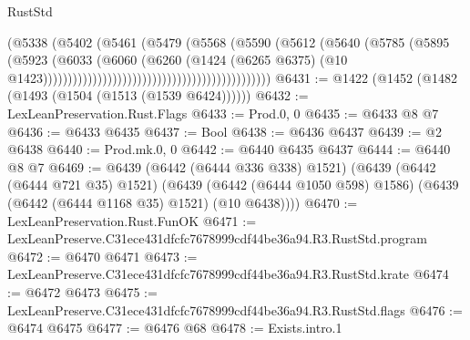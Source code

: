 \begin{lexlean}{RustStd}
\begin{coremodule}
                                                                (@5338
                                                                  (@5402
                                                                    (@5461
                                                                      (@5479
                                                                        (@5568
                                                                          (@5590
                                                                            (@5612
                                                                              (@5640
                                                                                (@5785
                                                                                  (@5895
                                                                                    (@5923
                                                                                      (@6033
                                                                                        (@6060
                                                                                          (@6260
                                                                                            (@1424
                                                                                              (@6265
                                                                                                @6375)
                                                                                              (@10
                                                                                                @1423))))))))))))))))))))))))))))))))))))))))))))))
@6431 := @1422 (@1452 (@1482 (@1493 (@1504 (@1513 (@1539 @6424))))))
@6432 := LexLeanPreservation.Rust.Flags
@6433 := Prod.{0, 0}
@6435 := @6433 @8 @7
@6436 := @6433 @6435
@6437 := Bool
@6438 := @6436 @6437
@6439 := @2 @6438
@6440 := Prod.mk.{0, 0}
@6442 := @6440 @6435 @6437
@6444 := @6440 @8 @7
@6469 := @6439
    (@6442 (@6444 @336 @338) @1521)
    (@6439
      (@6442 (@6444 @721 @35) @1521)
      (@6439 (@6442 (@6444 @1050 @598) @1586) (@6439 (@6442 (@6444 @1168 @35) @1521) (@10 @6438))))
@6470 := LexLeanPreservation.Rust.FunOK
@6471 := LexLeanPreserve.C31ece431dfcfc7678999cdf44be36a94.R3.RustStd.program
@6472 := @6470 @6471
@6473 := LexLeanPreserve.C31ece431dfcfc7678999cdf44be36a94.R3.RustStd.krate
@6474 := @6472 @6473
@6475 := LexLeanPreserve.C31ece431dfcfc7678999cdf44be36a94.R3.RustStd.flags
@6476 := @6474 @6475
@6477 := @6476 @68
@6478 := Exists.intro.{1}

\end{coremodule}
\end{lexlean}
